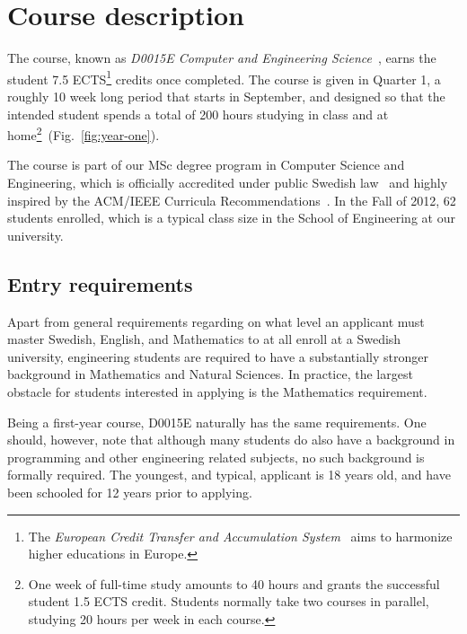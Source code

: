 \documentclass[conference]{IEEEtran}
\begin{document}
\section{Course description}

The course, known as \emph{D0015E Computer and Engineering Science}~\cite{d0015e}, earns the student 7.5 ECTS\footnote{The \emph{European Credit Transfer and Accumulation System}~\cite{ects} aims to harmonize higher educations in Europe.} credits once completed. The course is given in Quarter 1, a roughly 10 week long period that starts in September, and designed so that the intended student spends a total of 200 hours studying in class and at home\footnote{One week of full-time study amounts to 40 hours and grants the successful student 1.5 ECTS credit. Students normally take two courses in parallel, studying 20 hours per week in each course.}~(Fig.~\ref{fig:year-one}). 

The course is part of our MSc degree program in Computer Science and Engineering, which is officially accredited under public Swedish law~\cite{hogskole} and highly inspired by the ACM/IEEE Curricula Recommendations~\cite{acm}. In the Fall of 2012, 62 students enrolled, which is a typical class size in the School of Engineering at our university. 

\subsection{Entry requirements}
Apart from general requirements regarding on what level an applicant must master Swedish, English, and Mathematics to at all enroll at a Swedish university, engineering students are required to have a substantially stronger background in Mathematics and Natural Sciences. In practice, the largest obstacle for students interested in applying is the Mathematics requirement. 

Being a first-year course, D0015E naturally has the same requirements. One should, however, note that although many students do also have a background in programming and other engineering related subjects, no such background is formally required. 
The youngest, and typical, applicant is 18 years old, and have been schooled for 12 years prior to applying. 
\end{document}
